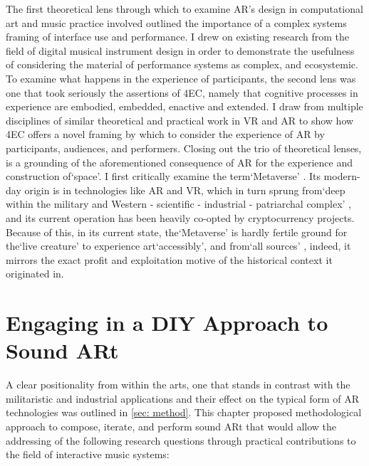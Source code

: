The first theoretical lens through which to examine AR's design in computational art and music practice involved outlined the importance of a complex systems framing of interface use and performance. I drew on existing research from the field of digital musical instrument design \citep{magnusson2009a,discipio2003,essl2006,armstrong2006,hayes2019,chevalier2018} in order to demonstrate the usefulness of considering the material of performance systems as complex, and ecosystemic. To examine what happens in the experience of participants, the second lens was one that took seriously the assertions of 4EC, namely that cognitive processes in experience are embodied, embedded, enactive and extended. I draw from multiple disciplines of similar theoretical and practical work in VR and AR to show how 4EC offers a novel framing by which to consider the experience of AR by participants, audiences, and performers. Closing out the trio of theoretical lenses, is a grounding of the aforementioned consequence of AR for the experience and construction of`space'. I first critically examine the term`Metaverse' \citep{stephenson1992}. Its modern-day origin is in technologies like AR and VR, which in turn sprung from`deep within the military and Western - scientific - industrial - patriarchal complex' \citep{davies2004}, and its current operation has been heavily co-opted by cryptocurrency projects. Because of this, in its current state, the`Metaverse' is hardly fertile ground for the`live creature' to experience art`accessibly', and from`all sources' \citep{dewey1934,leddy2021}, indeed, it mirrors the exact profit and exploitation motive of the historical context it originated in.



\section{Engaging in a DIY Approach to Sound ARt} \label{sec: discussion-method}
A clear positionality from within the arts, one that stands in contrast with the militaristic and industrial applications and their effect on the typical form of AR technologies was outlined in \autoref{sec: method}. This chapter proposed methodological approach to compose, iterate, and perform sound ARt that would allow the addressing of the following research questions through practical contributions to the field of interactive music systems: 

\begin{enumerate}
    \RQmedium
    \RQexperience
    \RQfuture
\end{enumerate}


